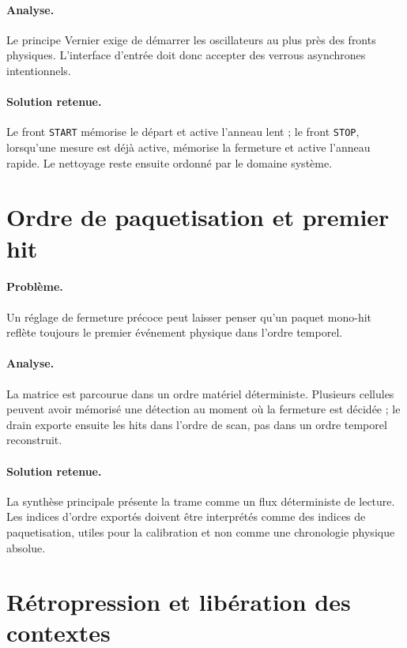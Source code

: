 \paragraph{Analyse.}
Le principe Vernier exige de démarrer les oscillateurs au plus près des fronts physiques. L'interface d'entrée doit donc accepter des verrous asynchrones intentionnels.

\paragraph{Solution retenue.}
Le front \texttt{START} mémorise le départ et active l'anneau lent ; le front \texttt{STOP}, lorsqu'une mesure est déjà active, mémorise la fermeture et active l'anneau rapide. Le nettoyage reste ensuite ordonné par le domaine système.

\section{Ordre de paquetisation et premier hit}

\paragraph{Problème.}
Un réglage de fermeture précoce peut laisser penser qu'un paquet mono-hit reflète toujours le premier événement physique dans l'ordre temporel.

\paragraph{Analyse.}
La matrice est parcourue dans un ordre matériel déterministe. Plusieurs cellules peuvent avoir mémorisé une détection au moment où la fermeture est décidée ; le drain exporte ensuite les hits dans l'ordre de scan, pas dans un ordre temporel reconstruit.

\paragraph{Solution retenue.}
La synthèse principale présente la trame comme un flux déterministe de lecture. Les indices d'ordre exportés doivent être interprétés comme des indices de paquetisation, utiles pour la calibration et non comme une chronologie physique absolue.

\section{Rétropression et libération des contextes}

